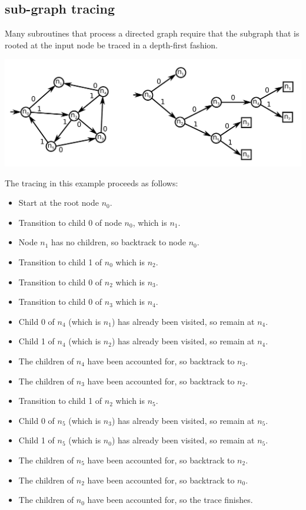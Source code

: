 \documentclass{article}
\begin{document}




\subsection{sub-graph tracing}

Many subroutines that process a directed graph require that the subgraph that is rooted at the input node be traced in a depth-first fashion.

\includegraphics[width = \textwidth]{subgraph_with_tracer_tree}

The tracing in this example proceeds as follows: 

\begin{itemize}
\item Start at the root node \(n_0\).
\item Transition to child 0 of node \(n_0\), which is \(n_1\). 
\item Node \(n_1\) has no children, so backtrack to node \(n_0\). 
\item Transition to child 1 of \(n_0\) which is \(n_2\).
\item Transition to child 0 of \(n_2\) which is \(n_3\). 
\item Transition to child 0 of \(n_3\) which is \(n_4\).
\item Child 0 of \(n_4\) (which is \(n_1\)) has already been visited, so remain at \(n_4\).
\item Child 1 of \(n_4\) (which is \(n_2\)) has already been visited, so remain at \(n_4\). 
\item The children of \(n_4\) have been accounted for, so backtrack to \(n_3\).
\item The children of \(n_3\) have been accounted for, so backtrack to \(n_2\). 
\item Transition to child 1 of \(n_2\) which is \(n_5\). 
\item Child 0 of \(n_5\) (which is \(n_3\)) has already been visited, so remain at \(n_5\).
\item Child 1 of \(n_5\) (which is \(n_0\)) has already been visited, so remain at \(n_5\). 
\item The children of \(n_5\) have been accounted for, so backtrack to \(n_2\). 
\item The children of \(n_2\) have been accounted for, so backtrack to \(n_0\).
\item The children of \(n_0\) have been accounted for, so the trace finishes.
\end{itemize}
\end{document}
